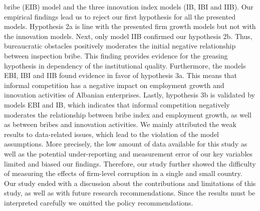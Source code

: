 bribe (EIB) model and the three innovation index models (IB, IBI and IIB). Our empirical findings lead us to reject our first hypothesis for all the presented models. Hypothesis 2a is line with the presented firm growth models but not with the innovation models. Next, only model IIB confirmed our hypothesis 2b. Thus, bureaucratic obstacles positively moderates the initial negative relationship between inspection bribe. This finding provides evidence for the greasing hypothesis in dependency of the institutional quality. Furthermore, the models EBI, IBI and IIB found evidence in favor of hypothesis 3a. This means that informal competition has a negative impact on employment growth and innovation activities of Albanian enterprises. Lastly, hypothesis 3b is validated by models EBI and IB, which indicates that informal competition negatively moderates the relationship between bribe index and employment growth, as well as between bribes and innovation activities. We mainly attributed the weak results 
to data-related issues, which lead to the violation of the model assumptions. More precisely, the low amount of data available for this study as well as the potential under-reporting and measurement error of our key variables limited and biased our findings. Therefore, our study further showed the difficulty of measuring the effects of firm-level corruption in a single and small country. Our study ended with a discussion about the contributions and limitations of this study, as well as with future research recommendations. Since the results must be interpreted carefully we omitted the policy recommendations. 

